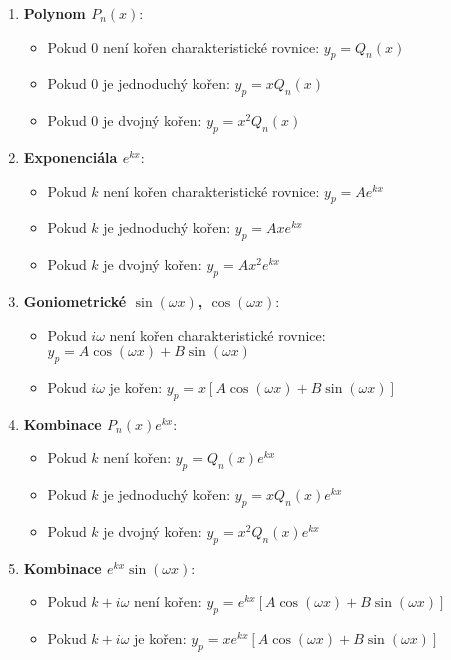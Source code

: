 \begin{enumerate}
\item \textbf{Polynom $P_n(x)$}:
\begin{itemize}
\item Pokud $0$ není kořen charakteristické rovnice: $y_p = Q_n(x)$
\item Pokud $0$ je jednoduchý kořen: $y_p = xQ_n(x)$
\item Pokud $0$ je dvojný kořen: $y_p = x^2Q_n(x)$
\end{itemize}

\item \textbf{Exponenciála $e^{kx}$}:
\begin{itemize}
\item Pokud $k$ není kořen charakteristické rovnice: $y_p = Ae^{kx}$
\item Pokud $k$ je jednoduchý kořen: $y_p = Axe^{kx}$
\item Pokud $k$ je dvojný kořen: $y_p = Ax^2e^{kx}$
\end{itemize}

\item \textbf{Goniometrické $\sin(\omega x)$, $\cos(\omega x)$}:
\begin{itemize}
\item Pokud $i\omega$ není kořen charakteristické rovnice: $y_p = A\cos(\omega x) + B\sin(\omega x)$
\item Pokud $i\omega$ je kořen: $y_p = x[A\cos(\omega x) + B\sin(\omega x)]$
\end{itemize}

\item \textbf{Kombinace $P_n(x)e^{kx}$}:
\begin{itemize}
\item Pokud $k$ není kořen: $y_p = Q_n(x)e^{kx}$
\item Pokud $k$ je jednoduchý kořen: $y_p = xQ_n(x)e^{kx}$
\item Pokud $k$ je dvojný kořen: $y_p = x^2Q_n(x)e^{kx}$
\end{itemize}

\item \textbf{Kombinace $e^{kx}\sin(\omega x)$}:
\begin{itemize}
\item Pokud $k + i\omega$ není kořen: $y_p = e^{kx}[A\cos(\omega x) + B\sin(\omega x)]$
\item Pokud $k + i\omega$ je kořen: $y_p = xe^{kx}[A\cos(\omega x) + B\sin(\omega x)]$
\end{itemize}
\end{enumerate}

